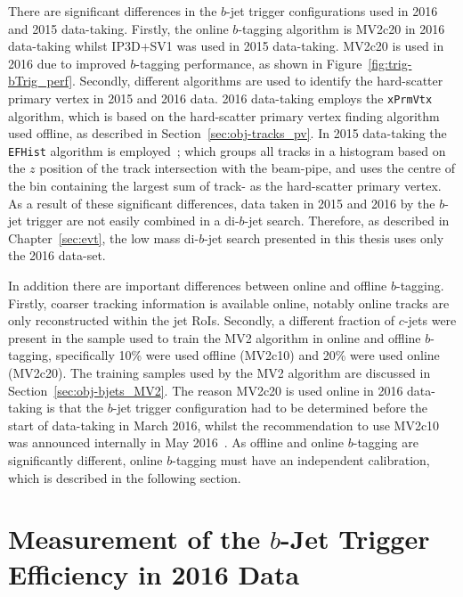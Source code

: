 There are significant differences in the  $b$-jet trigger configurations used in 2016 and 2015 data-taking.
Firstly, the online $b$-tagging algorithm is MV2c20 in 2016 data-taking whilst IP3D+SV1 was used in 2015 data-taking.
MV2c20 is used in 2016 due to improved $b$-tagging performance, as shown in Figure~\ref{fig:trig-bTrig_perf}.
Secondly, different algorithms are used to identify the hard-scatter primary vertex in 2015 and 2016 data.
2016 data-taking employs the \verb|xPrmVtx| algorithm, which is based on the hard-scatter primary vertex finding algorithm used offline, as described in Section~\ref{sec:obj-tracks_pv}.
In 2015 data-taking the \verb|EFHist| algorithm is employed~\cite{trig-EFHist};
which groups all tracks in a histogram based on the $z$ position of the track intersection with the beam-pipe,
and uses the centre of the bin containing the largest sum of track-\pT{} as the hard-scatter primary vertex.
As a result of these significant differences, data taken in 2015 and 2016 by the $b$-jet trigger are not easily combined in a di-$b$-jet search.
Therefore, as described in Chapter~\ref{sec:evt}, the low mass di-$b$-jet search presented in this thesis uses only the 2016 data-set.

In addition there are important differences between online and offline $b$-tagging.
Firstly, coarser tracking information is available online, notably online tracks are only reconstructed within the jet RoIs.
Secondly, a different fraction of $c$-jets were present in the sample used to train the MV2 algorithm in online and offline $b$-tagging,
specifically 10\% were used offline (MV2c10) and 20\% were used online (MV2c20).
The training samples used by the MV2 algorithm are discussed in Section~\ref{sec:obj-bjets_MV2}.
The reason MV2c20 is used online in 2016 data-taking is that the $b$-jet trigger configuration
had to be determined before the start of data-taking in March 2016,
whilst the recommendation to use MV2c10 was announced internally in May 2016~\cite{obj-bjets_algo_2016}.
As offline and online $b$-tagging are significantly different, online $b$-tagging must have an independent calibration, which is described in the following section.


\section{ Measurement of the $b$-Jet Trigger Efficiency in 2016 Data}
\label{sec:trig-bjet_eff}

